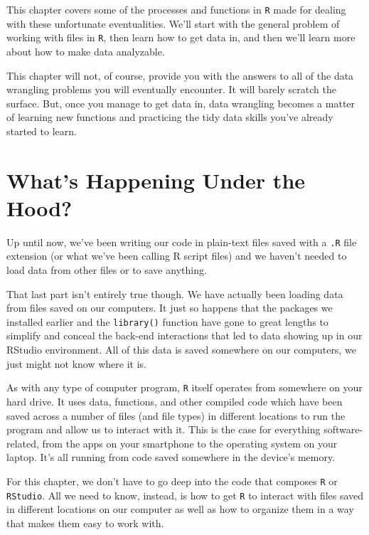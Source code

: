\documentclass[
  letterpaper,
]{book}
\begin{document}
This chapter covers some of the processes and functions in \texttt{R}
made for dealing with these unfortunate eventualities. We'll start with
the general problem of working with files in \texttt{R}, then learn how
to get data in, and then we'll learn more about how to make data
analyzable.

This chapter will not, of course, provide you with the answers to all of
the data wrangling problems you will eventually encounter. It will
barely scratch the surface. But, once you manage to get data in, data
wrangling becomes a matter of learning new functions and practicing the
tidy data skills you've already started to learn.

\hypertarget{whats-happening-under-the-hood}{%
\section{What's Happening Under the
Hood?}\label{whats-happening-under-the-hood}}

Up until now, we've been writing our code in plain-text files saved with
a \texttt{.R} file extension (or what we've been calling R script files)
and we haven't needed to load data from other files or to save anything.

That last part isn't entirely true though. We have actually been loading
data from files saved on our computers. It just so happens that the
packages we installed earlier and the \texttt{library()} function have
gone to great lengths to simplify and conceal the back-end interactions
that led to data showing up in our RStudio environment. All of this data
is saved somewhere on our computers, we just might not know where it is.

As with any type of computer program, \texttt{R} itself operates from
somewhere on your hard drive. It uses data, functions, and other
compiled code which have been saved across a number of files (and file
types) in different locations to run the program and allow us to
interact with it. This is the case for everything software-related, from
the apps on your smartphone to the operating system on your laptop. It's
all running from code saved somewhere in the device's memory.

For this chapter, we don't have to go deep into the code that composes
\texttt{R} or \texttt{RStudio}. All we need to know, instead, is how to
get \texttt{R} to interact with files saved in different locations on
our computer as well as how to organize them in a way that makes them
easy to work with.
\end{document}
